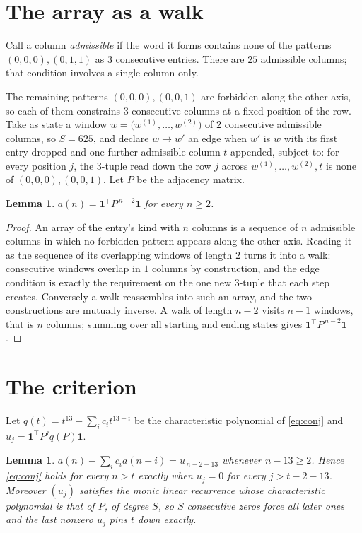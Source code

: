 \documentclass[11pt,a4paper]{article}
\theoremstyle{plain}
\newtheorem{lemma}[theorem]{Lemma}
\theoremstyle{definition}
\begin{document}
\section{The array as a walk}

Call a column \emph{admissible} if the word it forms contains none of the patterns
$(0,0,0), (0,1,1)$ as $3$ consecutive entries. There are $25$ admissible columns; that condition
involves a single column only.

The remaining patterns $(0,0,0), (0,0,1)$ are forbidden along the other axis, so each of them
constrains $3$ consecutive columns at a fixed position of the row. Take as state a
window $w=\bigl(w^{(1)},\dots,w^{(2)}\bigr)$ of $2$ consecutive admissible
columns, so $S=625$, and declare $w\to w'$ an edge when $w'$ is $w$ with its first entry
dropped and one further admissible column $t$ appended, subject to: for every position
$j$, the $3$-tuple read down the row $j$ across $w^{(1)},\dots,w^{(2)},t$
is none of $(0,0,0), (0,0,1)$. Let $P$ be the adjacency matrix.

\begin{lemma}\label{lem:walk}
$a(n)=\mathbf{1}^{\!\top}P^{\,n-2}\mathbf{1}$ for every $n\ge2$.
\end{lemma}

\begin{proof}
An array of the entry's kind with $n$ columns is a sequence of $n$ admissible columns in
which no forbidden pattern appears along the other axis. Reading it as the sequence of its
overlapping windows of length $2$ turns it into a walk: consecutive windows overlap in
$1$ columns by construction, and the edge condition is exactly the requirement on the one
new $3$-tuple that each step creates. Conversely a walk reassembles into such an array,
and the two constructions are mutually inverse. A walk of length $n-2$ visits $n-1$
windows, that is $n$ columns; summing over all starting and ending states gives
$\mathbf{1}^{\!\top}P^{\,n-2}\mathbf{1}$.
\end{proof}

\section{The criterion}

Let $q(t)=t^{13}-\sum_i c_i t^{13-i}$ be the characteristic polynomial of
\eqref{eq:conj} and $u_j=\mathbf{1}^{\!\top}P^{j}q(P)\mathbf{1}$.

\begin{lemma}\label{lem:crit}
$a(n)-\sum_i c_i a(n-i)=u_{\,n-2-13}$ whenever $n-13\ge2$. Hence
\eqref{eq:conj} holds for every $n>t$ exactly when $u_j=0$ for every
$j>t-2-13$. Moreover $(u_j)$ satisfies the monic linear recurrence whose
characteristic polynomial is that of $P$, of degree $S$, so $S$ consecutive zeros force all
later ones and the last nonzero $u_j$ pins $t$ down exactly.
\end{lemma}
\end{document}
